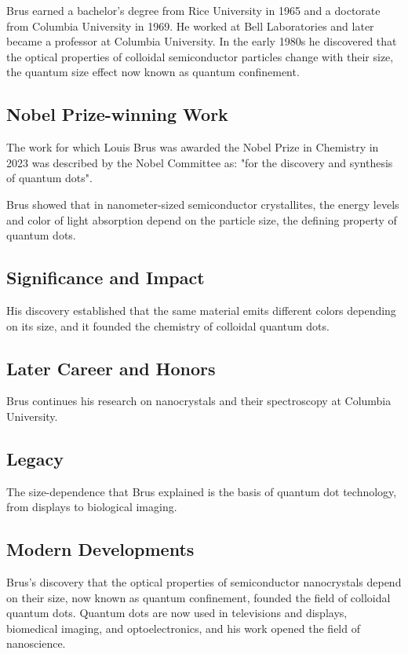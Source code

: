 Brus earned a bachelor's degree from Rice University in 1965 and a doctorate from Columbia University in 1969. He worked at Bell Laboratories and later became a professor at Columbia University. In the early 1980s he discovered that the optical properties of colloidal semiconductor particles change with their size, the quantum size effect now known as quantum confinement.

\subsection*{Nobel Prize-winning Work}

The work for which Louis Brus was awarded the Nobel Prize in Chemistry in 2023 was described by the Nobel Committee as: "for the discovery and synthesis of quantum dots".

Brus showed that in nanometer-sized semiconductor crystallites, the energy levels and color of light absorption depend on the particle size, the defining property of quantum dots.

\subsection*{Significance and Impact}

His discovery established that the same material emits different colors depending on its size, and it founded the chemistry of colloidal quantum dots.

\subsection*{Later Career and Honors}

Brus continues his research on nanocrystals and their spectroscopy at Columbia University.

\subsection*{Legacy}

The size-dependence that Brus explained is the basis of quantum dot technology, from displays to biological imaging.

\subsection*{Modern Developments}

Brus's discovery that the optical properties of semiconductor nanocrystals depend on their size, now known as quantum confinement, founded the field of colloidal quantum dots. Quantum dots are now used in televisions and displays, biomedical imaging, and optoelectronics, and his work opened the field of nanoscience.

